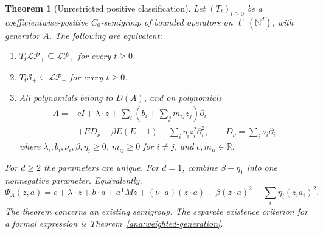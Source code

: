 \documentclass[reqno]{amsart}
\newtheorem{theorem}{Theorem}[section]
\theoremstyle{definition}
\theoremstyle{remark}
\newcommand{\R}{\mathbb R}
\newcommand{\N}{\mathbb N}
\begin{document}
\begin{theorem}[Unrestricted positive classification]\label{pos:symbol}
Let \((T_t)_{t\ge0}\) be a coefficientwise-positive \(C_0\)-semigroup of bounded
operators on \(\ell^1(\N^d)\), with generator \(A\).  The following are equivalent:
\begin{enumerate}
\item \(T_t\mathcal{LP}_+\subseteq\mathcal{LP}_+\) for every \(t\ge0\).
\item \(T_t\mathcal S_+\subseteq\mathcal{LP}_+\) for every \(t\ge0\).
\item All polynomials belong to \(D(A)\), and on polynomials
\begin{equation}\label{pos:canonical}
 \begin{aligned}
 A={}&cI+\lambda\cdot z+
 \sum_i\left(b_i+\sum_jm_{ij}z_j\right)\partial_i
 \\
 &+ED_\nu-\beta E(E-1)-\sum_i\eta_i z_i^2\partial_i^2,
 \qquad D_\nu=\sum_i\nu_i\partial_i .
 \end{aligned}
\end{equation}
where \(\lambda_i,b_i,\nu_i,\beta,\eta_i\ge0\), \(m_{ij}\ge0\) for \(i\ne j\),
and \(c,m_{ii}\in\R\).
\end{enumerate}
For \(d\ge2\) the parameters are unique.  For \(d=1\), combine \(\beta+\eta_1\)
into one nonnegative parameter.  Equivalently,
\begin{equation}\label{pos:log-symbol}
 \Psi_A(z,a)=c+\lambda\cdot z+b\cdot a+a^{\mathsf T}Mz
 +(\nu\cdot a)(z\cdot a)-\beta(z\cdot a)^2
 -\sum_i\eta_i(z_i a_i)^2.
\end{equation}
The theorem concerns an existing semigroup.  The separate existence criterion for
a formal expression is Theorem~\ref{ana:weighted-generation}.
\end{theorem}
\end{document}
